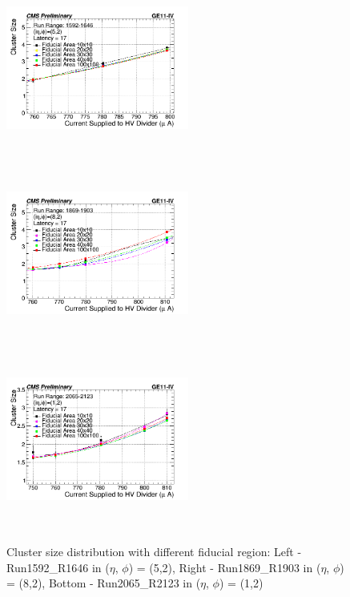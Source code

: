\begin{figure}[!htbp]
    \begin{center}
      \includegraphics[width=6cm,height=6cm]{figures/GEM/CurrentvsClusterSizeR1592R1646.png}%
      \includegraphics[width=6cm,height=6cm]{figures/GEM/CurrentvsClusterSizeR1869R1903.png}\\
      \includegraphics[width=6cm,height=6cm]{figures/GEM/CurrentvsClusterSizeR2065R2123.png}
    \end{center}
    \caption{Cluster size distribution with different fiducial region: Left - Run1592\_R1646 in ($\eta$, $\phi$) = (5,2), Right - Run1869\_R1903 in ($\eta$, $\phi$) = (8,2), Bottom - Run2065\_R2123 in ($\eta$, $\phi$) = (1,2)}
  \label{fig:CSDfiducialregion}
\end{figure}
